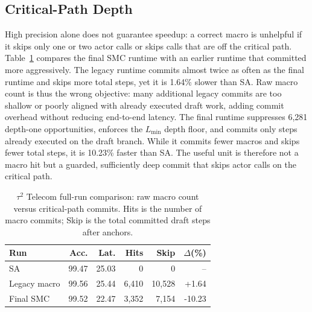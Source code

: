 \subsection{Critical-Path Depth}

High precision alone does not guarantee speedup: a correct macro is unhelpful if it skips only one or two actor calls or skips calls that are off the critical path.
Table~\ref{tab:legacy-final} compares the final SMC runtime with an earlier runtime that committed more aggressively.
The legacy runtime commits almost twice as often as the final runtime and skips more total steps, yet it is 1.64\% slower than SA. 
Raw macro count is thus the wrong objective: many additional legacy commits are too shallow or poorly aligned with already executed draft work, adding commit overhead without reducing end-to-end latency. 
The final runtime suppresses 6,281 depth-one opportunities, enforces the $L_{\min}$ depth floor, and commits only steps already executed on the draft branch. 
While it commits fewer macros and skips fewer total steps, it is 10.23\% faster than SA.
The useful unit is therefore not a macro hit but a guarded, sufficiently deep commit that skips actor calls on the critical path.

\begin{table}[t]
\centering
\small
\caption{$\tau^2$ Telecom full-run comparison: raw macro count versus critical-path commits. Hits is the number of macro commits; Skip is the total committed draft steps after anchors.}
\label{tab:legacy-final}
\begin{tabular}{lrrrrr}
\toprule
Run & Acc. & Lat. & Hits & Skip & $\Delta$(\%) \\
\midrule
SA & 99.47 & 25.03 & 0 & 0 & -- \\
Legacy macro & 99.56 & 25.44 & 6,410 & 10,528 & +1.64 \\
Final SMC & 99.52 & 22.47 & 3,352 & 7,154 & -10.23 \\
\bottomrule
\end{tabular}
\end{table}